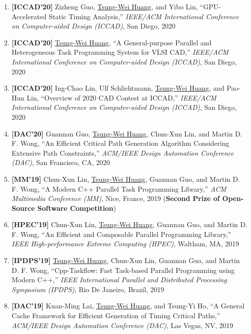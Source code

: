 \documentclass[A4,11pt]{article}
\begin{document}
\begin{enumerate}
    \item \textbf{[ICCAD'20]} Zizheng Guo, \underline{Tsung-Wei Huang}, and Yibo Lin, ``GPU-Accelerated Static Timing Analysis,'' \textit{IEEE/ACM International Conference on Computer-aided Design (ICCAD)}, San Diego, 2020 

    \item \textbf{[ICCAD'20]} \underline{Tsung-Wei Huang}, ``A General-purpose Parallel and Heterogeneous Task Programming System for VLSI CAD,'' \textit{IEEE/ACM International Conference on Computer-aided Design (ICCAD)}, San Diego, 2020

    \item \textbf{[ICCAD'20]} Ing-Chao Lin, Ulf Schlichtmann, \underline{Tsung-Wei Huang}, and Pao-Hun Lin, ``Overview of 2020 CAD Contest at ICCAD,'' \textit{IEEE/ACM International Conference on Computer-aided Design (ICCAD)}, San Diego, 2020

    \item \textbf{[DAC'20]} Guannan Guo, \underline{Tsung-Wei Huang}, Chun-Xun Lin, and Martin D. F. Wong, ``An Efficient Critical Path Generation Algorithm Considering Extensive Path Constraints,'' \textit{ACM/IEEE Design Automation Conference (DAC)}, San Francisco, CA, 2020

    \item \textbf{[MM'19]} Chun-Xun Lin, \underline{Tsung-Wei Huang}, Guannan Guo, and Martin D. F. Wong, ``A Modern C++ Parallel Task Programming Library,'' \textit{ACM Multimedia Conference (MM)}, Nice, France, 2019 (\textbf{Second Prize of Open-Source Software Competition})

    \item \textbf{[HPEC'19]} Chun-Xun Lin, \underline{Tsung-Wei Huang}, Guannan Guo, and Martin D. F. Wong, ``An Efficient and Composable Parallel Programming Library,'' \textit{IEEE High-performance Extreme Computing (HPEC)}, Waltham, MA, 2019

    \item \textbf{[IPDPS'19]} \underline{Tsung-Wei Huang}, Chun-Xun Lin, Guannan Guo, and Martin D. F. Wong, ``Cpp-Taskflow: Fast Task-based Parallel Programming using Modern C++,'' \textit{IEEE International Parallel and Distributed Processing Symposium (IPDPS)}, Rio De Janeiro, Brazil, 2019

    \item \textbf{[DAC'19]} Kuan-Ming Lai, \underline{Tsung-Wei Huang}, and Tsung-Yi Ho, ``A General Cache Framework for Efficient Generation of Timing Critical Paths,'' \textit{ACM/IEEE Design Automation Conference (DAC)}, Las Vegas, NV, 2019


\end{enumerate}
\end{document}
